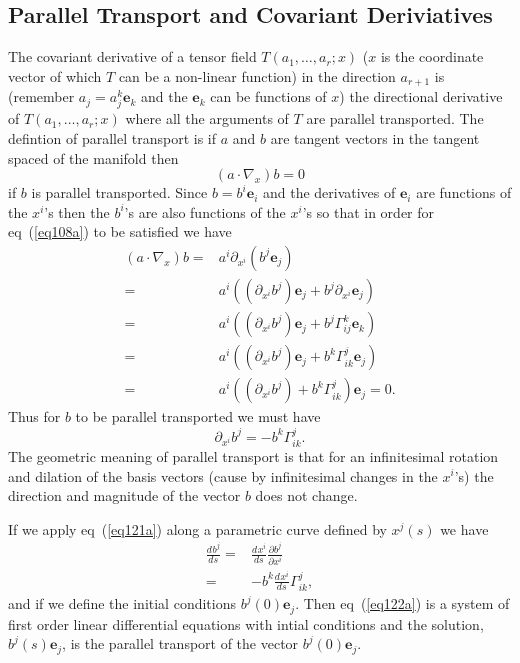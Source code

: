 \documentclass[12pt]{report}
\newcommand{\bm}[1]{\boldsymbol{#1}}
\newcommand{\bfrac}[2]{\displaystyle\frac{#1}{#2}}
\newcommand{\lp}{\left (}
\newcommand{\rp}{\right )}
\newcommand{\pdiff}[2]{\bfrac{\partial {#1}}{\partial {#2}}}
\newcommand{\f}[2]{{#1}\lp {#2} \rp}
\newcommand{\paren}[1]{\lp {#1} \rp}
\newcommand{\deriv}[3]{\bfrac{d^{#3}#1}{d{#2}^{#3}}}
\newcommand{\be}{\begin{equation}}
\newcommand{\ee}{\end{equation}}
\newcommand{\eb}{\bm{e}}
\begin{document}
\subsection{Parallel Transport and Covariant Deriviatives}
The covariant derivative of a tensor field $\f{T}{a_{1},\dots,a_{r};x}$ ($x$ is the coordinate vector of which $T$ can be a non-linear function) in
the direction $a_{r+1}$ is (remember $a_{j} = a_{j}^{k}\eb_{k}$ and the $\eb_{k}$ can be functions of $x$) the directional derivative of 
$\f{T}{a_{1},\dots,a_{r};x}$ where all the arguments of $T$ are parallel transported. The defintion of parallel transport is if $a$ and $b$ are
tangent vectors in the tangent spaced of the manifold then
\be
	\paren{a\cdot\nabla_{x}}b = 0 \label{eq108a}
\ee
if $b$ is parallel transported.  Since $b = b^{i}\eb_{i}$ and the derivatives of $\eb_{i}$ are functions of the $x^{i}$'s then the $b^{i}$'s are
also functions of the $x^{i}$'s so that in order for eq~(\ref{eq108a}) to be satisfied we have
\begin{align}
	\paren{a\cdot\nabla_{x}}b =& a^{i}\partial_{x^{i}}\paren{b^{j}\eb_{j}} \nonumber \\
	                          =& a^{i}\paren{\paren{\partial_{x^{i}}b^{j}}\eb_{j} + b^{j}\partial_{x^{i}}\eb_{j}} \nonumber \\
	                          =& a^{i}\paren{\paren{\partial_{x^{i}}b^{j}}\eb_{j} + b^{j}\Gamma_{ij}^{k}\eb_{k}} \nonumber \\
	                          =& a^{i}\paren{\paren{\partial_{x^{i}}b^{j}}\eb_{j} + b^{k}\Gamma_{ik}^{j}\eb_{j}}\nonumber \\
	                          =& a^{i}\paren{\paren{\partial_{x^{i}}b^{j}} + b^{k}\Gamma_{ik}^{j}}\eb_{j} = 0.
\end{align}
Thus for $b$ to be parallel transported we must have
\be
	\partial_{x^{i}}b^{j} = -b^{k}\Gamma_{ik}^{j}. \label{eq121a}
\ee
The geometric meaning of parallel transport is that for an infinitesimal rotation and dilation of the basis vectors (cause by infinitesimal changes in the $x^{i}$'s) the direction and magnitude of the vector $b$ does not change.

If we apply eq~(\ref{eq121a}) along a parametric curve defined by $\f{x^{j}}{s}$ we have
\begin{align}
	\deriv{b^{j}}{s}{} =& \deriv{x^{i}}{s}{}\pdiff{b^{j}}{x^{i}} \nonumber \\
	                   =& -b^{k}\deriv{x^{i}}{s}{}\Gamma_{ik}^{j}, \label{eq122a}
\end{align}
and if we define the initial conditions $\f{b^{j}}{0}\eb_{j}$.  Then eq~(\ref{eq122a}) is a system of first order
linear differential equations with intial conditions and the solution, $\f{b^{j}}{s}\eb_{j}$, is the parallel transport of the
vector $\f{b^{j}}{0}\eb_{j}$.
\end{document}
